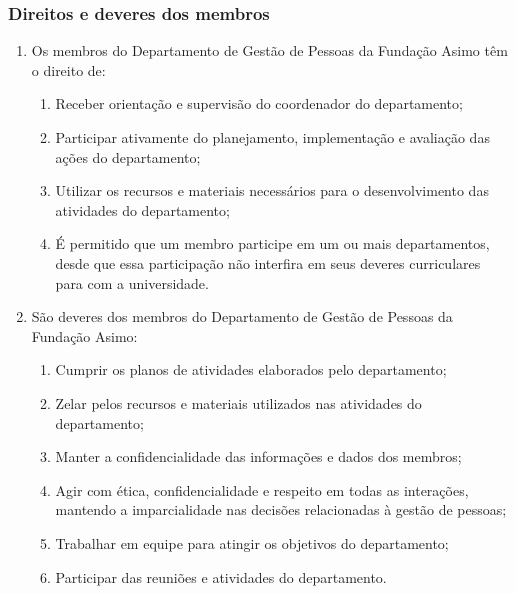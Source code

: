         \subsubsection{Direitos e deveres dos membros}   
        \begin{enumerate}
            \item Os membros do Departamento de Gestão de Pessoas da Fundação Asimo têm o direito de:
            \begin{enumerate}
                \item Receber orientação e supervisão do coordenador do departamento;
                \item Participar ativamente do planejamento, implementação e avaliação das ações do departamento;
                \item Utilizar os recursos e materiais necessários para o desenvolvimento das atividades do departamento;
                \item É permitido que um membro participe em um ou mais departamentos, desde que essa participação não interfira em seus deveres curriculares para com a universidade.
            \end{enumerate}
            \item São deveres dos membros do Departamento de Gestão de Pessoas da Fundação Asimo:
            \begin{enumerate}
                \item Cumprir os planos de atividades elaborados pelo departamento;
                \item Zelar pelos recursos e materiais utilizados nas atividades do departamento;
                \item Manter a confidencialidade das informações e dados dos membros;
                \item Agir com ética, confidencialidade e respeito em todas as interações, mantendo a imparcialidade nas decisões relacionadas à gestão de pessoas;
                \item Trabalhar em equipe para atingir os objetivos do departamento;
                \item Participar das reuniões e atividades do departamento.
            \end{enumerate}
        \end{enumerate}

